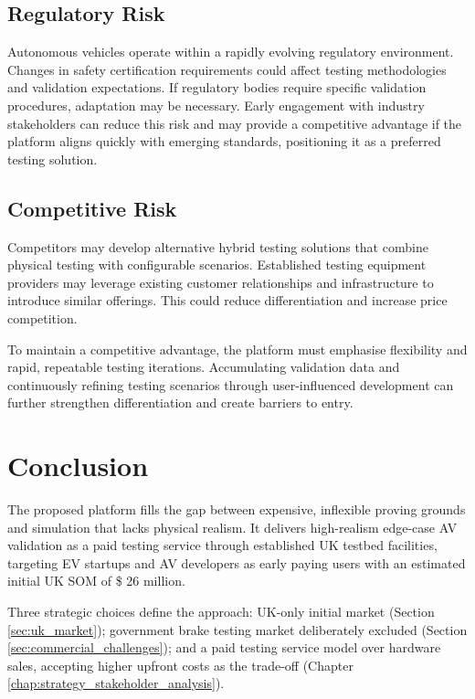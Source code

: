 \documentclass[11pt, a4paper]{report}
\numberwithin{equation}{section}
\begin{document}
\begin{refsection}
\subsection{Regulatory Risk}

Autonomous vehicles operate within a rapidly evolving regulatory environment. Changes in safety certification requirements could affect testing methodologies and validation expectations. If regulatory bodies require specific validation procedures, adaptation may be necessary. Early engagement with industry stakeholders can reduce this risk and may provide a competitive advantage if the platform aligns quickly with emerging standards, positioning it as a preferred testing solution.

\subsection{Competitive Risk}

Competitors may develop alternative hybrid testing solutions that combine physical testing with configurable scenarios. Established testing equipment providers may leverage existing customer relationships and infrastructure to introduce similar offerings. This could reduce differentiation and increase price competition.

To maintain a competitive advantage, the platform must emphasise flexibility and rapid, repeatable testing iterations. Accumulating validation data and continuously refining testing scenarios through user-influenced development can further strengthen differentiation and create barriers to entry.

\section{Conclusion}

The proposed platform fills the gap between expensive, inflexible proving grounds and simulation that lacks physical realism. It delivers high-realism edge-case AV validation as a paid testing service through established UK testbed facilities, targeting EV startups and AV developers as early paying users with an estimated initial UK SOM of \$ 26 million.

Three strategic choices define the approach: UK-only initial market (Section \ref{sec:uk_market}); government brake testing market deliberately excluded (Section \ref{sec:commercial_challenges}); and a paid testing service model over hardware sales, accepting higher upfront costs as the trade-off (Chapter \ref{chap:strategy_stakeholder_analysis}).


\end{refsection}
\end{document}
